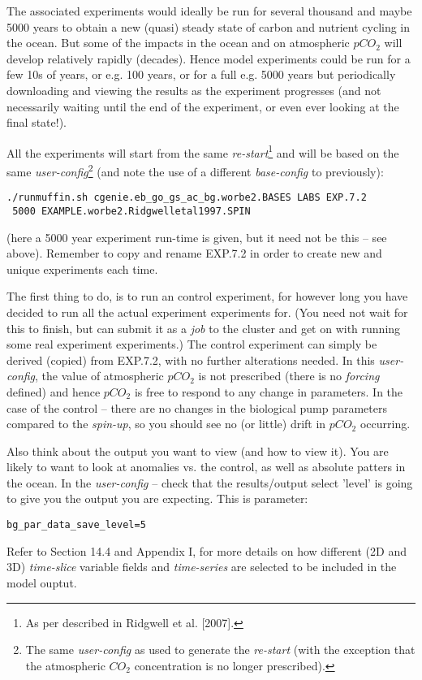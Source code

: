 \documentclass[11pt,fleqn]{book} %
\begin{document}
The associated experiments would ideally be run for several thousand and maybe 5000 years to obtain a new (quasi) steady state of carbon and nutrient cycling in the ocean. But some of the impacts in the ocean and on atmospheric \(pCO_{2}\) will develop relatively rapidly (decades). Hence model experiments could be run for a few 10s of years, or e.g. 100 years, or for a full e.g. 5000 years but periodically downloading and viewing the results as the experiment progresses (and not necessarily waiting until the end of the experiment, or even ever looking at the final state!).

All the experiments will start from the same \textit{re-start}\footnote{As per described in Ridgwell et al. [2007].} and will be based on the same \textit{user-config}\footnote{The same \textit{user-config} as used to generate the \textit{re-start} (with the exception that the atmospheric \(CO_{2}\) concentration is no longer prescribed).} (and note the use of a different \textit{base-config} to previously):
\vspace{-2mm}\begin{verbatim}
./runmuffin.sh cgenie.eb_go_gs_ac_bg.worbe2.BASES LABS EXP.7.2
 5000 EXAMPLE.worbe2.Ridgwelletal1997.SPIN
\end{verbatim}\vspace{-2mm}
(here a 5000 year experiment run-time is given, but it need not be this -- see above). Remember to copy and rename \textsf{\footnotesize EXP.7.2} in order to create new and unique experiments each time.

\pagebreak

The first thing to do, is to run an control experiment, for however long you have decided to run all the actual experiment experiments for. (You need not wait for this to finish, but can submit it as a \textit{job} to the cluster and get on with running some real experiment experiments.) The control experiment can simply be derived (copied) from \textsf{\footnotesize EXP.7.2}, with no further alterations needed. In this \textit{user-config}, the value of atmospheric  \(pCO_{2}\) is not prescribed (there is no \textit{forcing} defined) and hence \(pCO_{2}\) is free to respond to any change in parameters. In the case of the control -- there are no changes in the biological pump parameters compared to the \textit{spin-up}, so you should see no (or little) drift in \(pCO_{2}\) occurring.

Also think about the output you want to view (and how to view it). You are likely to want to look at anomalies vs. the control, as well as absolute patters in the ocean. In the \textit{user-config} -- check that the results/output select 'level' is going to give you the output you are expecting. This is parameter:
\vspace{-1mm}\small\begin{verbatim}
bg_par_data_save_level=5
\end{verbatim}\normalsize\vspace{-1mm}
Refer to Section 14.4 and Appendix I, for more details on how different (2D and 3D) \textit{time-slice} variable fields and \textit{time-series} are selected to be included in the model ouptut. 
\end{document}
